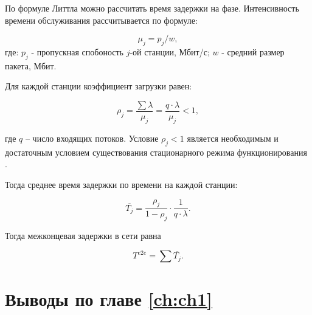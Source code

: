 По формуле Литтла \cite{Little1961} можно рассчитать время задержки на фазе. Интенсивность времени обслуживания рассчитывается по формуле: 

\begin{displaymath}
    \mu_j = p_j / w,
\end{displaymath}
где: $p_j$ - пропускная спобоность $j$-ой станции, Мбит/с; $w$ - средний размер пакета, Мбит.

Для каждой станции коэффициент загрузки равен:


\begin{displaymath}
\rho_j= \frac{\sum{\lambda}}{\mu_j} = \frac{q \cdot \lambda}{\mu_j} <1,
\end{displaymath}

где $q$ -- число входящих потоков. Условие $\rho_j<1$ является необходимым и достаточным условием существования стационарного режима функционирования .

Тогда среднее время задержки по времени на каждой станции:

\begin{displaymath}
    \overline{T_j} = \frac{\rho_j}{1 - \rho_j} \cdot \frac{1}{q \cdot \lambda}.
\end{displaymath}

Тогда межконцевая задержки в сети равна

\begin{equation}
    \label{eq:end_to_end_delay}
    T^{e2e}= \sum{\overline{T_j}}.
\end{equation}

\section{Выводы по главе \cref{ch:ch1}}




